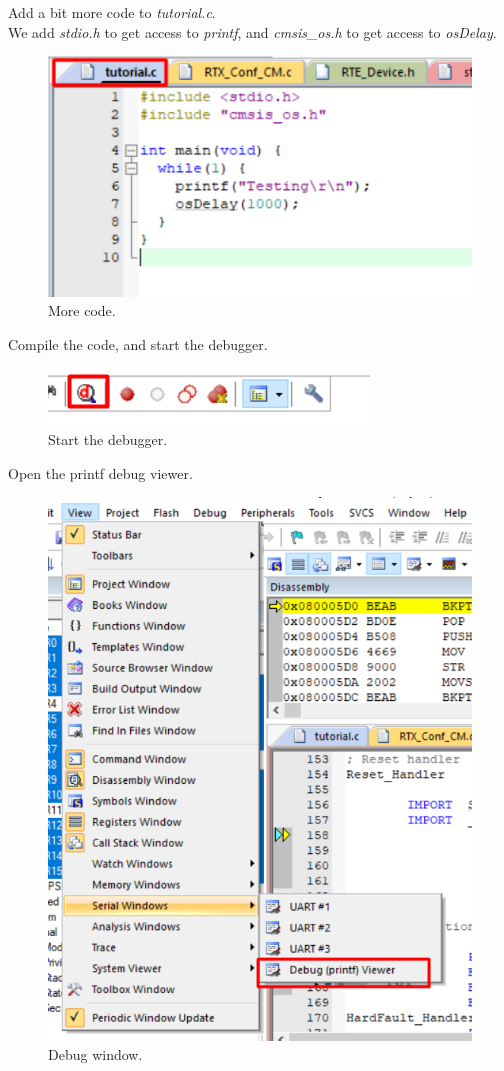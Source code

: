 \documentclass{article}
\begin{document}
\newpage

Add a bit more code to \textit{tutorial.c}.\\
We add \textit{stdio.h} to get access to \textit{printf}, and \textit{cmsis\_os.h}
to get access to \textit{osDelay}.
\begin{figure}[H]
    \centering
    \includegraphics[width=0.8\linewidth]{pics/PrintfMain.png}
    \caption{More code.}
    \label{fig:ModeCode}
\end{figure}

Compile the code, and start the debugger.
\begin{figure}[H]
    \centering
    \includegraphics[width=0.5\linewidth]{pics/StartDebugger.png}
    \caption{Start the debugger.}
    \label{fig:StartDebugger}
\end{figure}

\newpage

Open the printf debug viewer.
\begin{figure}[H]
    \centering
    \includegraphics[width=0.8\linewidth]{pics/DebugWindow.png}
    \caption{Debug window.}
    \label{fig:DebugWindow}
\end{figure}
\end{document}
